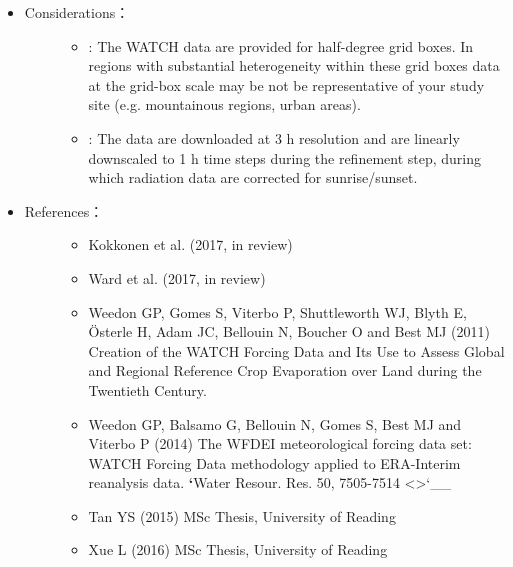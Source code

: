 \documentclass[letterpaper,10pt,english]{sphinxmanual}
\begin{document}
\begin{itemize}
\begin{description}
\end{description}

\item {} \begin{description}
\item[{Considerations：}] \leavevmode\begin{itemize}
\item {} 
: The WATCH data are provided for half-degree grid boxes. In regions with substantial heterogeneity within these grid boxes data at the grid-box scale may be not be representative of your study site (e.g. mountainous regions, urban areas).

\item {} 
: The data are downloaded at 3 h resolution and are linearly downscaled to 1 h time steps during the refinement step, during which radiation data are corrected for sunrise/sunset.

\end{itemize}

\end{description}

\item {} \begin{description}
\item[{References：}] \leavevmode\begin{itemize}
\item {} 
Kokkonen et al. (2017, in review)

\item {} 
Ward et al. (2017, in review)

\item {} 
Weedon GP, Gomes S, Viterbo P, Shuttleworth WJ, Blyth E, Österle H, Adam JC, Bellouin N, Boucher O and Best MJ (2011) Creation of the WATCH Forcing Data and Its Use to Assess Global and Regional Reference Crop Evaporation over Land during the Twentieth Century. 

\item {} 
Weedon GP, Balsamo G, Bellouin N, Gomes S, Best MJ and Viterbo P (2014) The WFDEI meteorological forcing data set: WATCH Forcing Data methodology applied to ERA-Interim reanalysis data. {\color{red}\bfseries{}{}`}Water Resour. Res. 50, 7505-7514       \textless{}\textgreater{}{}`\_\_\textbar{}

\item {} 
Tan YS (2015) MSc Thesis, University of Reading

\item {} 
Xue L (2016) MSc Thesis, University of Reading

\end{itemize}

\end{description}

\end{itemize}
\end{document}
